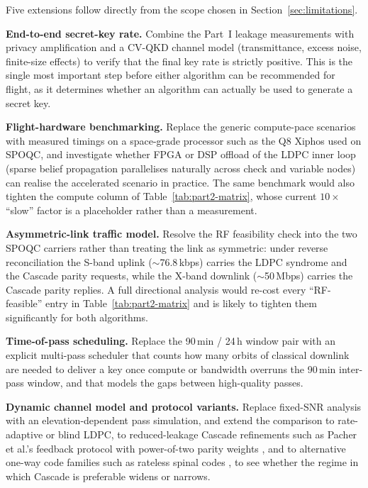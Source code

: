 \documentclass{UoYCSproject}
\begin{document}
Five extensions follow directly from the scope chosen in
Section~\ref{sec:limitations}.

\textbf{End-to-end secret-key rate.} Combine the Part~I leakage measurements
with privacy amplification and a CV-QKD channel model (transmittance,
excess noise, finite-size effects) to verify that the final key rate is
strictly positive. This is the single most important step before either
algorithm can be recommended for flight, as it determines whether an algorithm can actually be used to generate a secret key.

\textbf{Flight-hardware benchmarking.} Replace the generic compute-pace
scenarios with measured timings on a space-grade processor such as the Q8
Xiphos used on SPOQC, and investigate whether FPGA or DSP offload of the
LDPC inner loop (sparse belief propagation parallelises naturally across
check and variable nodes) can realise the accelerated scenario in
practice. The same benchmark would also tighten the compute column of
Table~\ref{tab:part2-matrix}, whose current $10\times$ ``slow'' factor is
a placeholder rather than a measurement.

\textbf{Asymmetric-link traffic model.} Resolve the RF feasibility check
into the two SPOQC carriers rather than treating the link as symmetric:
under reverse reconciliation the S-band uplink ($\sim$76.8\,kbps) carries
the LDPC syndrome and the Cascade parity requests, while the X-band
downlink ($\sim$50\,Mbps) carries the Cascade parity replies. A full
directional analysis would re-cost every ``RF-feasible'' entry in
Table~\ref{tab:part2-matrix} and is likely to tighten them significantly
for both algorithms.

\textbf{Time-of-pass scheduling.} Replace the 90\,min / 24\,h window
pair with an explicit multi-pass scheduler that counts how many orbits
of classical downlink are needed to deliver a key once compute or
bandwidth overruns the 90\,min inter-pass window, and that models the
gaps between high-quality passes.

\textbf{Dynamic channel model and protocol variants.} Replace fixed-SNR
analysis with an elevation-dependent pass simulation, and extend the
comparison to rate-adaptive or blind LDPC, to reduced-leakage Cascade
refinements such as Pacher et al.'s feedback protocol with power-of-two
parity weights \cite{pacher_information_2015}, and to alternative one-way
code families such as rateless spinal codes \cite{wen_novel_2019}, to see
whether the regime in which Cascade is preferable widens or narrows.
\end{document}
